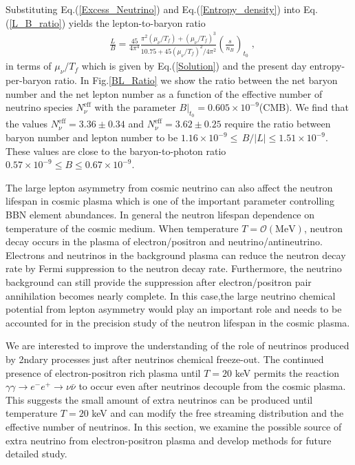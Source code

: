 Substituting Eq.\;(\ref{Excess_Neutrino}) and Eq.\;(\ref{Entropy_density}) into Eq.\;(\ref{L_B_ratio}) yields the lepton-to-baryon ratio
\begin{align}\label{L_B_ratio_final}
&\frac{L}{B}=\frac{45}{4\pi^4}\frac{\pi^2(\mu_\nu/T_f)+(\mu_\nu/T_f)^3}{10.75+{45}(\mu_\nu/T_f)^2/{4\pi^2}}\left(\frac{s}{n_B}\right)_{\!\!t_0}\;,
\end{align}
in terms of $\mu_\nu/T_f$ which is given by Eq.(\ref{Solution}) and the present day entropy-per-baryon ratio. In Fig.\;\ref{BL_Ratio} we show the ratio between the net baryon number and the net lepton number as a function of the effective number of neutrino species $N^{\mathrm{eff}}_\nu$ with the parameter $ B|_{t_0} =0.605\times 10^{-9}$(CMB). We find that the values $N_\nu^{\mathrm{eff}}=3.36\pm0.34$ and $N_\nu^{\mathrm{eff}}= 3.62\pm0.25$ require the ratio between baryon number and lepton number to be $1.16 \times 10^{-9} \leqslant\, B/|L| \leqslant 1.51\times 10^{-9}$. These values are close to the baryon-to-photon ratio $0.57 \times 10^{-9} \leqslant B  \leqslant 0.67\times 10^{-9}$. 


The large lepton asymmetry from cosmic neutrino can also affect the neutron lifespan in cosmic plasma which is one of the important parameter controlling BBN element abundances. 
In general the neutron lifespan dependence on temperature of the cosmic medium. When temperature $T=\mathcal{O}(\mathrm{MeV})$, neutron decay occurs in the plasma of electron/positron and 
 neutrino/antineutrino. Electrons and neutrinos in the background plasma can reduce the neutron decay rate by Fermi suppression to the neutron decay rate. Furthermore, the neutrino background can still provide the suppression after electron/positron pair annihilation becomes nearly complete. In this case,the large neutrino chemical potential from lepton asymmetry would play an important role and needs to be accounted for in the precision study of the neutron lifespan in the cosmic plasma.

 
We are interested to improve the understanding of the role of neutrinos produced by 2ndary processes just after neutrinos chemical freeze-out. The continued presence of electron-positron rich plasma until $T=20$ keV permits the reaction $\gamma\gamma\to e^-e^+\to\nu\bar{\nu}$ to occur even after neutrinos decouple from the cosmic plasma. This suggests the small amount of extra neutrinos can be produced until temperature $T=20$ keV and can modify the free streaming distribution and the effective number of neutrinos. In this section, we examine the possible source of extra neutrino from electron-positron plasma and develop methods for
future detailed study.

